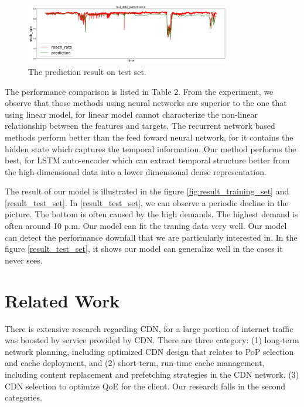 \documentclass[5p]{elsarticle}
\begin{document}
\begin{figure}[h]
    \centering
    \includegraphics[width=0.8\textwidth]{result_test_set.png}
    \caption{The prediction result on test set.}
    \label{fig:result_test_set}
\end{figure}




The performance comparison is listed in Table 2. From the experiment, we observe that those methods using neural networks are superior to the one that using linear model, for linear model cannot characterize the non-linear relationship between the features and targets. The recurrent network based methods perform better than the feed foward neural network, for it contains the hidden state which captures the temporal information. Our method performs the best, for LSTM auto-encoder which can extract temporal structure  better from the high-dimensional data into a lower dimensional dense representation.

The result of our model is illustrated in the figure \ref{fig:result_training_set} and \ref{result_test_set}. In \ref{result_test_set}, we can observe a periodic decline in the picture. The bottom is often caused by the high demands. The highest demand is often around 10 p.m. Our model can fit the traning data very well. Our model can detect the performance downfall that we are particularly interested in. In the figure \ref{result_test_set}, it shows our model can generalize well in the cases it never sees.

\section{Related Work}

There is extensive research regarding CDN, for a large portion of internet traffic was boosted by service provided by CDN. There are three category: (1) long-term network planning, including optimized CDN design that relates to PoP selection and cache deployment\cite{Krishnan2000}\cite{Hasan2014}\cite{Tang2017RethinkingDemands}, and (2) short-term, run-time cache management, including content replacement and prefetching strategies in the CDN network\cite{Borst2010}\cite{Leconte2016}\cite{Applegate2016}. (3) CDN selection to optimize QoE for the client\cite{Jiang2017Pytheas:Exploration-Exploitation}\cite{JiangCFA:Optimization}. Our research falls in the second categories.
\end{document}
